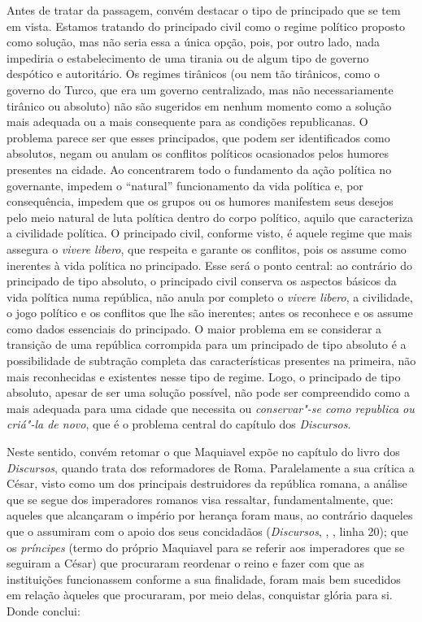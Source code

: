 Antes de tratar da passagem, convém destacar o tipo de principado que se
tem em vista. Estamos tratando do principado civil como o regime
político proposto como solução, mas não seria essa a única opção, pois,
por outro lado, nada impediria o estabelecimento de uma tirania ou de
algum tipo de governo despótico e autoritário. Os regimes tirânicos (ou
nem tão tirânicos, como o governo do Turco, que era um governo
centralizado, mas não necessariamente tirânico ou absoluto) não são
sugeridos em nenhum momento como a solução mais adequada ou a mais
consequente para as condições republicanas. O problema parece ser que
esses principados, que podem ser identificados como absolutos, negam ou
anulam os conflitos políticos ocasionados pelos humores presentes na
cidade. Ao concentrarem todo o fundamento da ação política no
governante, impedem o ``natural'' funcionamento da vida política e, por
consequência, impedem que os grupos ou os humores manifestem seus
desejos pelo meio natural de luta política dentro do corpo político,
aquilo que caracteriza a civilidade política. O principado civil,
conforme visto, é aquele regime que mais assegura o \emph{vivere
libero}, que respeita e garante os conflitos, pois os assume como
inerentes à vida política no principado. Esse será o ponto central: ao
contrário do principado de tipo absoluto, o principado civil conserva os
aspectos básicos da vida política numa república, não anula por completo
o \emph{vivere libero}, a civilidade, o jogo político e os conflitos que
lhe são inerentes; antes os reconhece e os assume como dados essenciais
do principado. O maior problema em se considerar a transição de uma
república corrompida para um principado de tipo absoluto é a
possibilidade de subtração completa das características presentes na
primeira, não mais reconhecidas e existentes nesse tipo de regime. Logo,
o principado de tipo absoluto, apesar de ser uma solução possível, não
pode ser compreendido como a mais adequada para uma cidade que necessita
ou \emph{conservar"-se como republica ou criá"-la de novo}, que é o
problema central do capítulo  dos \emph{Discursos}.

Neste sentido, convém retomar o que Maquiavel expõe no capítulo  do
livro  dos \emph{Discursos}, quando trata dos reformadores de Roma.
Paralelamente a sua crítica a César, visto como um dos principais
destruidores da república romana, a análise que se segue dos imperadores
romanos visa ressaltar, fundamentalmente, que: aqueles que alcançaram o
império por herança foram maus, ao contrário daqueles que o assumiram
com o apoio dos seus concidadãos (\emph{Discursos}, , , linha 20); que
os \emph{príncipes} (termo do próprio Maquiavel para se referir aos
imperadores que se seguiram a César) que procuraram reordenar o reino e
fazer com que as instituições funcionassem conforme a sua finalidade,
foram mais bem sucedidos em relação àqueles que procuraram, por meio
delas, conquistar glória para si. Donde conclui:

